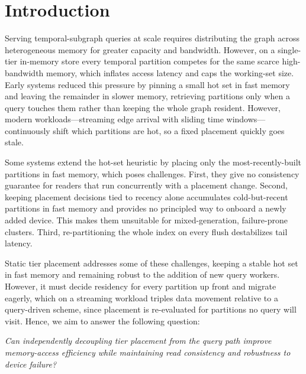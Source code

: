 \documentclass{article}
\begin{document}
\section{Introduction}
\label{sec:introduction}

Serving temporal-subgraph queries at scale requires distributing the graph across
heterogeneous memory for greater capacity and bandwidth. However, on a
single-tier in-memory store every temporal partition competes for the same scarce
high-bandwidth memory, which inflates access latency and caps the working-set size.
Early systems reduced this pressure by pinning a small hot set in fast memory and
leaving the remainder in slower memory, retrieving partitions only when a query
touches them rather than keeping the whole graph resident. However, modern
workloads---streaming edge arrival with sliding time windows---continuously shift
which partitions are hot, so a fixed placement quickly goes stale.

Some systems extend the hot-set heuristic by placing only the most-recently-built
partitions in fast memory, which poses challenges. First, they give no consistency
guarantee for readers that run concurrently with a placement change. Second, keeping
placement decisions tied to recency alone accumulates cold-but-recent partitions in
fast memory and provides no principled way to onboard a newly added device. This
makes them unsuitable for mixed-generation, failure-prone clusters. Third,
re-partitioning the whole index on every flush destabilizes tail latency.

Static tier placement addresses some of these challenges, keeping a stable hot set in
fast memory and remaining robust to the addition of new query workers. However, it
must decide residency for every partition up front and migrate eagerly, which on a
streaming workload triples data movement relative to a query-driven scheme, since
placement is re-evaluated for partitions no query will visit. Hence, we aim to answer
the following question:

\begin{center}
\emph{Can independently decoupling tier placement from the query path improve
memory-access efficiency while maintaining read consistency and robustness to
device failure?}
\end{center}
\end{document}
